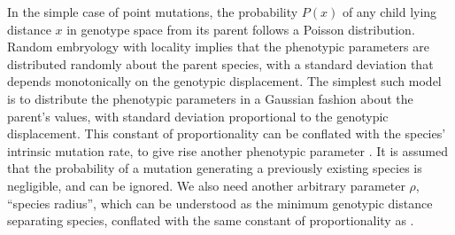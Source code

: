   In the simple case of point mutations, the probability $P(x)$ of any
child lying distance $x$ in genotype space from its parent follows a
Poisson distribution. Random embryology with locality implies that the
phenotypic parameters are distributed randomly about the parent
species, with a standard deviation that depends monotonically on the
genotypic displacement. The simplest such model is to distribute the
phenotypic parameters in a Gaussian fashion about the parent's values,
with standard deviation proportional to the genotypic
displacement. This constant of proportionality can be conflated with
the species' intrinsic mutation rate, to give rise another phenotypic
parameter \bmu.  It is assumed that the probability of a mutation generating
a previously existing species is negligible, and can be ignored. We
also need another arbitrary parameter $\rho$, ``species radius'',
which can be understood as the minimum genotypic distance separating
species, conflated with the same constant of proportionality as \bmu.

